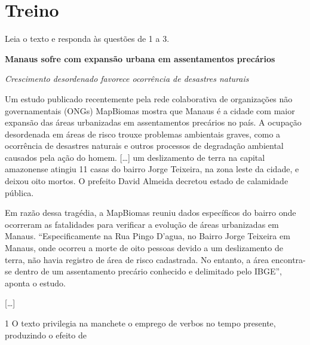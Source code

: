 \section*{Treino}

Leia o texto e responda às questões de 1 a 3.

\begin{myquote}
\centering\textbf{Manaus sofre com expansão urbana em assentamentos precários}

\emph{Crescimento desordenado favorece ocorrência de desastres naturais}
\end{myquote}

\begin{myquote}
Um estudo publicado recentemente pela rede colaborativa de organizações
não governamentais (ONGs) MapBiomas mostra que Manaus é a cidade com
maior expansão das áreas urbanizadas em assentamentos precários no país.
A ocupação desordenada em áreas de risco trouxe problemas ambientais
graves, como a ocorrência de desastres naturais e outros processos de
degradação ambiental causados pela ação do homem. {[}\ldots{]} um
deslizamento de terra na capital amazonense atingiu 11 casas do bairro
Jorge Teixeira, na zona leste da cidade, e deixou oito mortos. O
prefeito David Almeida decretou estado de calamidade pública.
\end{myquote}

\begin{myquote}
Em razão dessa tragédia, a MapBiomas reuniu dados específicos do bairro
onde ocorreram as fatalidades para verificar a evolução de áreas
urbanizadas em Manaus. ``Especificamente na Rua Pingo D'agua, no Bairro
Jorge Teixeira em Manaus, onde ocorreu a morte de oito pessoas devido a
um deslizamento de terra, não havia registro de área de risco
cadastrada. No entanto, a área encontra-se dentro de um assentamento
precário conhecido e delimitado pelo IBGE'', aponta o estudo.
\end{myquote}

\begin{myquote}
{[}\ldots{]}
\end{myquote}


\num{1} O texto privilegia na manchete o emprego de verbos no tempo
presente, produzindo o efeito de

